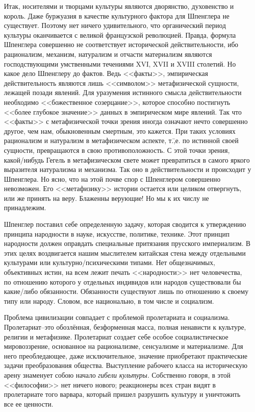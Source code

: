 Итак, носителями и творцами культуры являются дворянство, духовенство и король. Даже буржуазия в качестве культурного фактора для Шпенглера не существует. Поэтому нет ничего удивительного, что органический период культуры оканчивается с великой французской революцией. Правда, формула Шпенглера совершенно не соответствует исторической действительности, ибо рационализм, механизм, натурализм и отчасти материализм являются господствующими умственными течениями XVI, XVII и XVIII столетий. Но какое дело Шпенглеру до фактов. Ведь <<факты>>, эмпирическая действительность являются лишь <<символом>> метафизической сущности, лежащей позади явлений. Для уразумения истинного смысла действительности необходимо <<божественное созерцание>>, которое способно постигнуть <<более глубокое значение>> данных в эмпирическом мире явлений. Так что <<факты>> с метафизической точки зрения иногда означают нечто совершенно другое, чем нам, обыкновенным смертным, это кажется. При таких условиях рационализм и натурализм в метафизическом аспекте, т.\=,е. по истинной своей сущности, превращаются в свою противоположность. С этой точки зрения, какой\-/нибудь Гегель в метафизическом свете может превратиться в самого яркого выразителя натурализма и механизма. Так оно в действительности и происходит у Шпенглера. Но ясно, что на этой почве спор с Шпенглером совершенно невозможен. Его <<метафизику>> истории остается или целиком отвергнуть, или же принять на веру. Блаженны верующие! Но мы к их числу не принадлежим.

Шпенглер поставил себе определенную задачу, которая сводится к утверждению принципа народности в науке, искусстве, политике, технике. Этот принцип народности должен оправдать специальные притязания прусского империализм. В этих целях воздвигается нашим мыслителем китайская стена между отдельными культурами или культурно\-/психическими типами. Нет общезначимых, объективных истин, на всем лежит печать <<народности>> нет человечества, по отношению которого у отдельных индивидов или народов существовали бы какие\-/либо обязанности. Обязанности существуют лишь по отношению к своему типу или народу. Словом, все национально, в том числе и социализм.

Проблема цивилизации совпадает с проблемой пролетариата и социализма. Пролетариат\---это обозлённая, безформенная масса, полная ненависти к культуре, религии и метафизике. Пролетариат создает себе особое социалистическое мировоззрение, основанное на рационализме, сенсуализме и материализме. Для него преобледающее, даже исключительное, значение приобретают практические задачи преобразования общества. Выступление рабочего класса на историческую арену знаменует собою начало \emph{гибели культуры.} Собственно говоря, в этой <<философии>> нет ничего нового; реакционеры всех стран видят в пролетариате того варвара, который пришел разрушить культуру и уничтожить все ее ценности.

